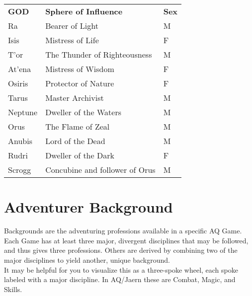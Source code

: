 \begin{multicols*}{2}
\begin{normbox}
\begin{tabular}{@{}l l l}
\small
\textbf{GOD} & \textbf{Sphere of Influence} & \textbf{Sex}\\
Ra & Bearer of Light & M\\
Isis & Mistress of Life & F\\
T'or & The Thunder of Righteousness & M\\
At'ena & Mistress of Wisdom & F\\
Osiris & Protector of Nature & F\\
Tarus & Master Archivist & M\\
Neptune & Dweller of the Waters & M\\
Orus & The Flame of Zeal & M\\
Anubis & Lord of the Dead & M\\
Rudri & Dweller of the Dark & F\\
Scrogg & Concubine and follower of Orus & M\\
\end{tabular}
\end{normbox}

\section{Adventurer Background}
Backgrounds are the adventuring professions available in a specific AQ Game. Each Game has at least three major, divergent disciplines that may be followed, and thus gives three professions. Others are derived by combining two of the major disciplines to yield another, unique background.\\
It may be helpful for you to visualize this as a three-spoke wheel, each spoke labeled with a major discipline. In AQ/Jaern these are Combat, Magic, and Skills.

\begin{center}


\end{center}
\end{multicols*}
